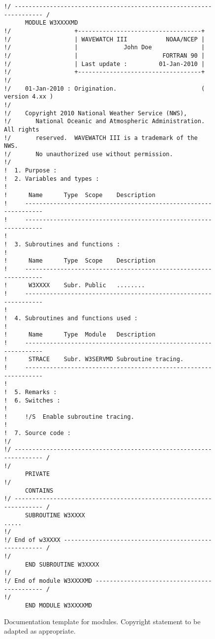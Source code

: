 \documentclass[12pt]{article}
\newcounter{myfigno}[section]
\newenvironment{myfig}[1]{\begin{figure}[#1]
                         \refstepcounter{myfigno}}                       
                        {\end{figure}}
\newcommand{\myfcap}[1]{\begin{list}{\ff Fig. \themyfigno\ :~\hfill}
                       {\rightmargin 8mm \labelsep 0mm
                        \labelwidth 8mm \leftmargin 8mm
                        \topsep 0mm \parskip 0mm \partopsep 0mm }
                        \item \ff #1 \end{list}}
\renewcommand{\themyfigno}{\thesection.\arabic{myfigno}}
\begin{document}
\begin{myfig}{tbp}
\begin{center}
\begin{minipage}[c]{4.5in}
\vspace{-10mm}
{\scriptsize \begin{verbatim}
!/ ------------------------------------------------------------------- /
      MODULE W3XXXXMD
!/                  +-----------------------------------+
!/                  | WAVEWATCH III           NOAA/NCEP |
!/                  |             John Doe              |
!/                  |                        FORTRAN 90 |
!/                  | Last update :         01-Jan-2010 |
!/                  +-----------------------------------+
!/
!/    01-Jan-2010 : Origination.                        ( version 4.xx )
!/
!/    Copyright 2010 National Weather Service (NWS),
!/       National Oceanic and Atmospheric Administration.  All rights
!/       reserved.  WAVEWATCH III is a trademark of the NWS. 
!/       No unauthorized use without permission.
!/
!  1. Purpose :
!  2. Variables and types :
!
!      Name      Type  Scope    Description
!     ----------------------------------------------------------------
!     ----------------------------------------------------------------
!
!  3. Subroutines and functions :
!
!      Name      Type  Scope    Description
!     ----------------------------------------------------------------
!      W3XXXX    Subr. Public   ........
!     ----------------------------------------------------------------
!
!  4. Subroutines and functions used :
!
!      Name      Type  Module   Description
!     ----------------------------------------------------------------
!      STRACE    Subr. W3SERVMD Subroutine tracing.
!     ----------------------------------------------------------------
!
!  5. Remarks :
!  6. Switches :
!
!     !/S  Enable subroutine tracing.
!
!  7. Source code :
!/
!/ ------------------------------------------------------------------- /
!/
      PRIVATE
!/
      CONTAINS
!/ ------------------------------------------------------------------- /
      SUBROUTINE W3XXXX
.....
!/
!/ End of w3XXXX ----------------------------------------------------- /
!/
      END SUBROUTINE W3XXXX
!/
!/ End of module W3XXXXMD -------------------------------------------- /
!/
      END MODULE W3XXXXMD
\end{verbatim}}
\end{minipage}
\end{center}

\myfcap{Documentation template for modules. Copyright statement to be adapted
        as appropriate.}
\label{fig:docu_mod}
\end{myfig}
\end{document}
